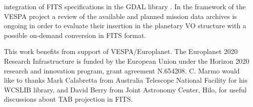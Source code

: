 \DIFdelbegin {}\DIFdelend \DIFaddbegin {}\DIFaddend integration of FITS specifications in the GDAL library \DIFaddbegin {}\DIFaddend .
In the framework of the VESPA project a review of the available and planned mission data
archives is ongoing in order to evaluate their insertion in the planetary VO structure
with a possible on-demand conversion in FITS format.


%
%
%
%

%

%

%

\acknowledgments
This work benefits from support of VESPA/Europlanet.
The Europlanet 2020 Research Infrastructure is funded by the European Union
under the Horizon 2020 research and innovation program, grant agreement N.654208.
C. Marmo would like to thanks Mark Calabretta from Australia Telescope National Facility
for his WCSLIB library, and David Berry from Joint Astronomy Center, Hilo, for useful
discussions about TAB projection in FITS.

